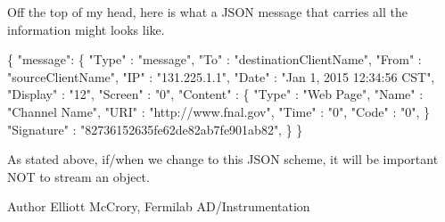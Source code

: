 Off the top of my head, here is what a J\-S\-O\-N message that carries all the information might looks like.


\begin{DoxyPre}
\{ "message": \{
    "Type"    : "message",
    "To"      : "destinationClientName",
    "From"    : "sourceClientName",
    "IP"      : "131.225.1.1",
    "Date"    : "Jan 1, 2015 12:34:56 CST",
    "Display" : "12",
    "Screen"  : "0",
    "Content" : \{
            "Type" : "Web Page",
         "Name" : "Channel Name",
         "URI"  : "http://www.fnal.gov",
         "Time" : "0",
         "Code" : "0",         
    \}
    "Signature" : "82736152635fe62de82ab7fe901ab82",
  \}
\}
\end{DoxyPre}


As stated above, if/when we change to this J\-S\-O\-N scheme, it will be important N\-O\-T to stream an object.

\begin{DoxyAuthor}{Author}
Elliott Mc\-Crory, Fermilab A\-D/\-Instrumentation 
\end{DoxyAuthor}


